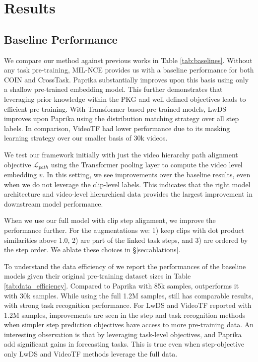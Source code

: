 \section{Results}

\subsection{Baseline Performance}


We compare our method against previous works in Table \ref{tab:baselines}. Without any task pre-training, MIL-NCE provides us with a baseline performance for both COIN and CrossTask. Paprika substantially improves upon this basis using only a shallow pre-trained embedding model. This further demonstrates that leveraging prior knowledge within the PKG and well defined objectives leads to efficient pre-training. With Transformer-based pre-trained models, LwDS improves upon Paprika using the distribution matching strategy over all step labels. In comparison, VideoTF had lower performance due to its masking learning strategy over our smaller basis of 30k videos. 

We test our framework initially with just the video hierarchy path alignment objective $\mathcal{L}_{path}$ using the Transformer pooling layer to compute the video level embedding $v$. In this setting, we see improvements over the baseline results, even when we do not leverage the clip-level labels. This indicates that the right model architecture and video-level hierarchical data provides the largest improvement in downstream model performance. 

When we use our full model with clip step alignment, we improve the performance further. For the augmentations we: 1) keep clips with dot product similarities above 1.0, 2) are part of the linked task steps, and 3) are ordered by the step order. We ablate these choices in \S \ref{sec:ablations}.

To understand the data efficiency of \model{} we report the performances of the baseline models given their original pre-training dataset sizes in Table \ref{tab:data_efficiency}. 
Compared to Paprika with 85k samples, \model{} outperforms it with 30k samples. While using the full 1.2M samples, \model{} still has comparable results, with strong task recognition performance. For LwDS and VideoTF reported with 1.2M samples, improvements are seen in the step and task recognition methods when simpler step prediction objectives have access to more pre-training data. An interesting observation is that by leveraging task-level objectives, \model{} and Paprika add significant gains in forecasting tasks. This is true even when step-objective only LwDS and VideoTF methods leverage the full data.



